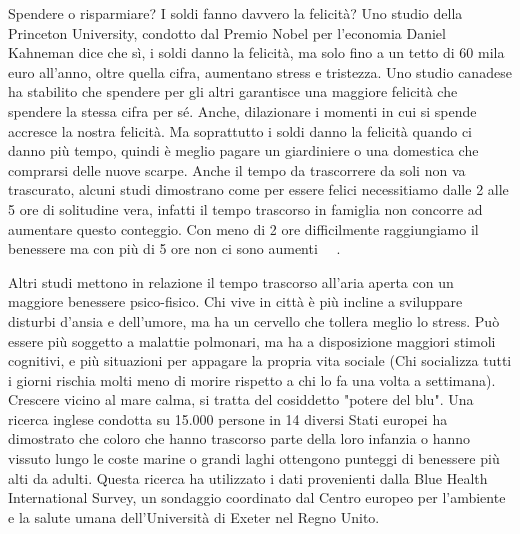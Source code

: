\documentclass[12pt]{book} %
\begin{document}
\begin{mdframed}[linewidth=1pt]
Spendere o risparmiare? I soldi fanno davvero la felicità? Uno studio della Princeton University, condotto dal Premio
Nobel per l'economia Daniel Kahneman dice che sì, i soldi danno la felicità, ma solo fino a un tetto di 60 mila euro
all'anno, oltre quella cifra, aumentano stress e tristezza. Uno studio canadese ha stabilito che spendere per gli altri
garantisce una maggiore felicità che spendere la stessa cifra per sé. Anche, dilazionare i momenti in cui si spende
accresce la nostra felicità. Ma soprattutto i soldi danno la felicità quando ci danno più tempo, quindi è meglio pagare
un giardiniere o una domestica che comprarsi delle nuove scarpe. Anche il tempo da trascorrere da soli non va
trascurato, alcuni studi dimostrano come per essere felici necessitiamo dalle 2 alle 5 ore di solitudine vera, infatti
il tempo trascorso in famiglia non concorre ad aumentare questo conteggio. Con meno di 2 ore difficilmente raggiungiamo
il benessere ma con più di 5 ore non ci sono aumenti
\ \ .


\bigskip

Altri studi mettono in relazione il tempo trascorso all'aria aperta con un maggiore benessere psico-fisico. Chi vive in
città è più incline a sviluppare disturbi d'ansia e dell'umore, ma ha un cervello che tollera meglio lo stress. Può
essere più soggetto a malattie polmonari, ma ha a disposizione maggiori stimoli cognitivi, e più situazioni per
appagare la propria vita sociale (Chi socializza tutti i giorni rischia molti meno di morire rispetto a chi lo fa una
volta a settimana).
Crescere vicino al mare calma, si tratta del cosiddetto "potere del blu". Una ricerca inglese condotta su 15.000 persone in 14 diversi Stati europei ha dimostrato che coloro che hanno trascorso parte della loro infanzia o hanno vissuto lungo le coste marine o grandi laghi ottengono punteggi di benessere più alti da adulti. Questa ricerca ha utilizzato i dati provenienti dalla Blue Health International Survey, un sondaggio coordinato dal Centro europeo per l'ambiente e la salute umana dell'Università di Exeter nel Regno Unito.


\end{mdframed}
\end{document}
